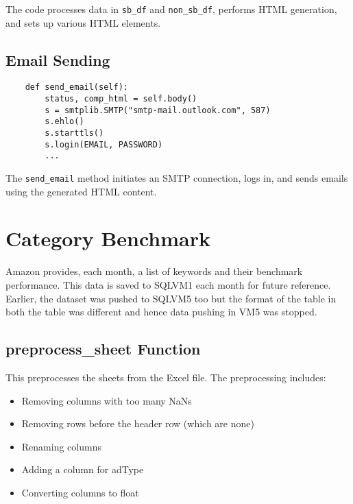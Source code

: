 The code processes data in \texttt{sb\_df} and \texttt{non\_sb\_df}, performs HTML generation, and sets up various HTML elements.

\subsection{Email Sending}
\begin{lstlisting}
    def send_email(self):
        status, comp_html = self.body()
        s = smtplib.SMTP("smtp-mail.outlook.com", 587)
        s.ehlo()
        s.starttls()
        s.login(EMAIL, PASSWORD)
        ...
\end{lstlisting}

The \texttt{send\_email} method initiates an SMTP connection, logs in, and sends emails using the generated HTML content.

\section{Category Benchmark}

Amazon provides, each month, a list of keywords and their benchmark performance. This data is saved to SQLVM1 each month for future reference. Earlier, the dataset was pushed to SQLVM5 too but the format of the table in both the table was different and hence data pushing in VM5 was stopped.

\subsection{preprocess\_sheet Function}
This preprocesses the sheets from the Excel file. The preprocessing includes:
\begin{itemize}
    \item Removing columns with too many NaNs
    \item Removing rows before the header row (which are none)
    \item Renaming columns
    \item Adding a column for adType
    \item Converting columns to float
\end{itemize}

